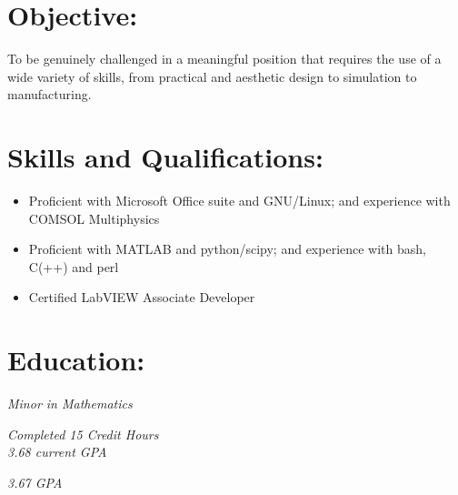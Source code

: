 \documentclass{resume}
\author{ Joshua Holbrook }
\begin{document}
\maketitle

\section{Objective:}

\small To be genuinely challenged in a meaningful position that requires the use of a wide variety of skills, from practical and aesthetic design to simulation to manufacturing. \normalsize

\section{Skills and Qualifications:}
\small\begin{itemize}

    \item Proficient with Microsoft Office suite and GNU/Linux; and experience with COMSOL Multiphysics

    \item Proficient with MATLAB and python/scipy; and experience with bash, C(++) and perl

    \item Certified LabVIEW Associate Developer

\end{itemize}\normalsize

\section{Education:}


    
        \textit{Minor in Mathematics}
    
    
        \emph{Completed 15 Credit Hours}\\
    
    
        \emph{ 3.68 current GPA}\\
    

    
    
    
        \emph{ 3.67 GPA}\\
    

    
\end{document}
